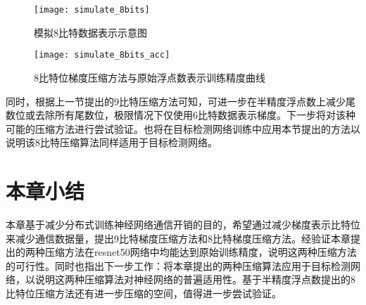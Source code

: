 \begin{figure}[htp]
\centering
\texttt{[image: simulate\_8bits]}
\caption{模拟8比特数据表示示意图}
\label{fig:simulate_8bits}
\end{figure}

\begin{figure}[htp]
\centering
\texttt{[image: simulate\_8bits\_acc]}
\caption{8比特位梯度压缩方法与原始浮点数表示训练精度曲线}
\label{fig:simulate_8bits_acc}
\end{figure}

同时，根据上一节提出的9比特压缩方法可知，可进一步在半精度浮点数上减少尾数位或去除所有尾数位，极限情况下仅使用6比特数据表示梯度。下一步将对该种可能的压缩方法进行尝试验证。也将在目标检测网络训练中应用本节提出的方法以说明该8比特压缩算法同样适用于目标检测网络。

\section{本章小结}
本章基于减少分布式训练神经网络通信开销的目的，希望通过减少梯度表示比特位来减少通信数据量，提出9比特梯度压缩方法和8比特梯度压缩方法。经验证本章提出的两种压缩方法在resnet50网络中均能达到原始训练精度，说明这两种压缩方法的可行性。同时也指出下一步工作：将本章提出的两种压缩算法应用于目标检测网络，以说明这两种压缩算法对神经网络的普遍适用性。基于半精度浮点数提出的8比特位压缩方法还有进一步压缩的空间，值得进一步尝试验证。







